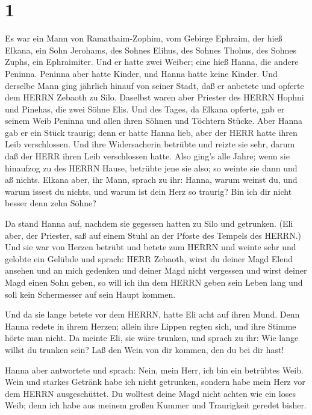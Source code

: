 \hypertarget{section}{%
\section{1}\label{section}}

 Es war ein Mann von Ramathaim-Zophim, vom Gebirge Ephraim,
der hieß Elkana, ein Sohn Jerohams, des Sohnes Elihus, des Sohnes
Thohus, des Sohnes Zuphs, ein Ephraimiter.  Und er hatte
zwei Weiber; eine hieß Hanna, die andere Peninna. Peninna aber hatte
Kinder, und Hanna hatte keine Kinder.  Und derselbe Mann
ging jährlich hinauf von seiner Stadt, daß er anbetete und opferte dem
HERRN Zebaoth zu Silo. Daselbst waren aber Priester des HERRN Hophni und
Pinehas, die zwei Söhne Elis.  Und des Tages, da Elkana
opferte, gab er seinem Weib Peninna und allen ihren Söhnen und Töchtern
Stücke.  Aber Hanna gab er ein Stück traurig; denn er hatte
Hanna lieb, aber der HERR hatte ihren Leib verschlossen. 
Und ihre Widersacherin betrübte und reizte sie sehr, darum daß der HERR
ihren Leib verschlossen hatte.  Also ging's alle Jahre; wenn
sie hinaufzog zu des HERRN Hause, betrübte jene sie also; so weinte sie
dann und aß nichts.  Elkana aber, ihr Mann, sprach zu ihr:
Hanna, warum weinst du, und warum issest du nichts, und warum ist dein
Herz so traurig? Bin ich dir nicht besser denn zehn Söhne?

 Da stand Hanna auf, nachdem sie gegessen hatten zu Silo und
getrunken. (Eli aber, der Priester, saß auf einem Stuhl an der Pfoste
des Tempels des HERRN.)  Und sie war von Herzen betrübt und
betete zum HERRN und weinte sehr  und gelobte ein Gelübde
und sprach: HERR Zebaoth, wirst du deiner Magd Elend ansehen und an mich
gedenken und deiner Magd nicht vergessen und wirst deiner Magd einen
Sohn geben, so will ich ihn dem HERRN geben sein Leben lang und soll
kein Schermesser auf sein Haupt kommen.

 Und da sie lange betete vor dem HERRN, hatte Eli acht auf
ihren Mund.  Denn Hanna redete in ihrem Herzen; allein ihre
Lippen regten sich, und ihre Stimme hörte man nicht. Da meinte Eli, sie
wäre trunken,  und sprach zu ihr: Wie lange willst du
trunken sein? Laß den Wein von dir kommen, den du bei dir hast!

 Hanna aber antwortete und sprach: Nein, mein Herr, ich bin
ein betrübtes Weib. Wein und starkes Getränk habe ich nicht getrunken,
sondern habe mein Herz vor dem HERRN ausgeschüttet.  Du
wolltest deine Magd nicht achten wie ein loses Weib; denn ich habe aus
meinem großen Kummer und Traurigkeit geredet bisher.

